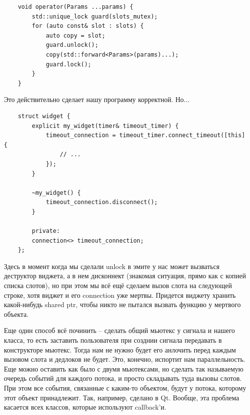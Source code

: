 \documentclass[12pt, a4paper]{article}
\begin{document}
\begin{verbatim}
	void operator(Params ...params) {
		std::unique_lock guard(slots_mutex);
		for (auto const& slot : slots) {
			auto copy = slot;
			guard.unlock();
			copy(std::forward<Params>(params)...);
			guard.lock();
		}
	}  
\end{verbatim}
Это действительно сделает нашу программу корректной. Но...
\begin{verbatim}
	struct widget {
		explicit my_widget(timer& timeout_timer) {
			timeout_connection = timeout_timer.connect_timeout([this] {
				// ...
			});
		}
		
		~my_widget() {
			timeout_connection.disconnect();
		}
		
		private:
		connection<> timeout_connection;
	};
\end{verbatim}
Здесь в момент когда мы сделали unlock в эмите у нас может вызваться деструктор виджета, а в нем дисконнект (знакомая ситуация, прямо как с копией списка слотов), но при этом мы всё ещё сделаем вызов слота на следующей строке, хотя виджет и его connection уже мертвы. Придется виджету хранить какой-нибудь shared ptr, чтобы никто не пытался вызвать функцию у мертвого объекта.
\par Еще один способ всё починить -- сделать общий мьютекс у сигнала и нашего класса, то есть заставить пользователя при созднии сигнала передавать в конструкторе мьютекс. Тогда нам не нужно будет его анлочить перед каждым вызовом слота и дедлоков не будет. Это, конечно, испортит нам параллельность. Еще можно оставить как было с двумя мьютексами, но сделать так называемую очередь событий для каждого потока, и просто складывать туда вызовы слотов. При этом все события, связанные с каким-то объектом, будут у потока, которому этот объект принадлежит. Так, например, сделано в Qt. Вообще, эта проблема касается всех классов, которые используют callback'и.
\end{document}
